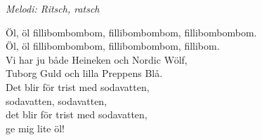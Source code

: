 {\footnotesize\textit{Melodi: Ritsch, ratsch}}\par
\vspace{10pt}
Öl, öl fillibombombom, fillibombombom, fillibombombom.\\
Öl, öl fillibombombom, fillibombombom, fillibom.\\
Vi har ju både Heineken och Nordic Wölf,\\
Tuborg Guld och lilla Preppens Blå.\\
Det blir för trist med sodavatten,\\
sodavatten, sodavatten,\\
det blir för trist med sodavatten,\\
ge mig lite öl!
